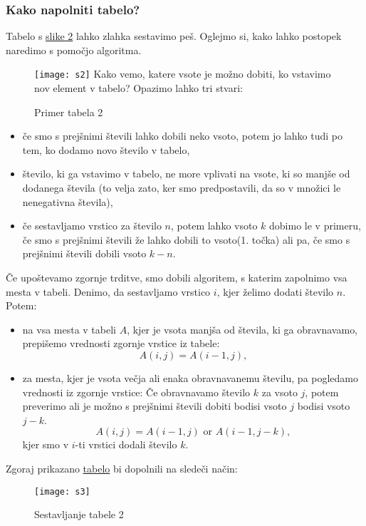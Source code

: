 \documentclass[12pt]{article}
\begin{document}
\subsubsection{Kako napolniti tabelo?}
Tabelo s \hyperref[sec:s2]{slike 2} lahko zlahka sestavimo peš. 
Oglejmo si, kako lahko postopek naredimo s pomočjo algoritma. 
\newline
\label{sec:s2}
\begin{figure}[h]
  \caption{Primer tabela 2}
  \texttt{[image: s2]}
  Kako vemo, katere vsote je možno dobiti, ko vstavimo nov element v tabelo?
Opazimo lahko tri stvari:
\end{figure}
\begin{itemize}
  \item če smo s prejšnimi števili lahko dobili neko vsoto, potem jo  lahko tudi
  po tem, ko dodamo novo število v tabelo,
  \item število, ki ga vstavimo v tabelo, ne more vplivati na vsote, ki so manjše od dodanega števila
  (to velja zato, ker smo predpostavili, da so v množici le nenegativna števila),
  \item če sestavljamo vrstico za število $n$, potem lahko vsoto $k$ dobimo le v primeru, če smo s prejšnimi
  števili že lahko dobili to vsoto(1. točka) ali pa, če smo s prejšnimi števili dobili vsoto $k-n$.
\end{itemize}
Če upoštevamo zgornje trditve, smo dobili algoritem, s katerim zapolnimo vsa mesta v tabeli.
\newline Denimo, da sestavljamo vrstico $i$, kjer želimo dodati število $n$. Potem:
\begin{itemize}
  \item na vsa mesta v tabeli $A$, kjer je vsota manjša od  
  števila, ki ga obravnavamo, prepišemo vrednosti zgornje vrstice iz tabele:
  \[A(i,j) = A(i-1,j),\]
  \item za mesta, kjer je vsota večja ali enaka obravnavanemu številu, pa pogledamo 
  vrednosti iz zgornje vrstice: Če obravnavamo število $k$ za vsoto $j$, potem preverimo ali je možno
  s prejšnimi števili dobiti bodisi vsoto $j$ bodisi vsoto $j-k$. 
  \[A(i,j) = A(i-1,j) \text{ or }  A(i-1,j-k),\] kjer smo v $i$-ti vrstici dodali število $k$.
\end{itemize}
Zgoraj prikazano \hyperref[sec:s2]{tabelo} bi dopolnili na sledeči način:\newline
\begin{figure}[h]
  \caption{Sestavljanje tabele 2}  
  \texttt{[image: s3]}
  \centering
\end{figure}\newline
\end{document}
